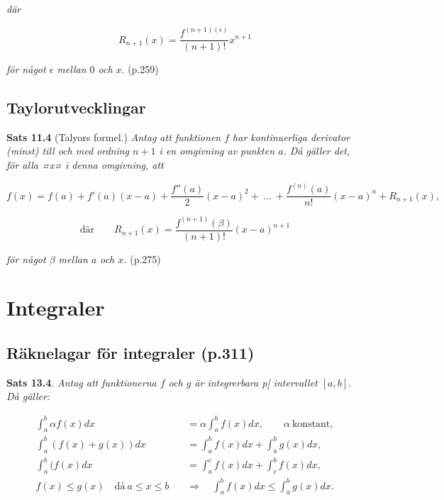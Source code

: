 \documentclass[11pt]{article}
\begin{document}
\textit{där}


\begin{equation}
    R_{n + 1}(x) = \frac{f^{(n + 1)(\epsilon)}}{(n +  1)!}x^{n + 1}
    \label{eq:maclaurinpolynom_rest}
\end{equation}

\textit{för något $\epsilon$ mellan $0$ och $x$}. (p.259)

\subsection{Taylorutvecklingar}

\textbf{Sats 11.4} (Talyors formel.) \textit{Antag att funktionen $f$ har kontinuerliga derivator (minst) till och med ordning $n + 1$ i en omgivning av punkten $a$. Då gäller det, för alla ¤x¤ i denna omgivning, att}

\begin{equation}
    f(x) = f(a) + f'(a)(x - a) + \frac{f''(a)}{2}(x - a)^2 +\ ...\ + \frac{f^{(n)}(a)}{n!}(x - a)^n + R_{n + 1}(x),
\end{equation}

\begin{equation}
    \text{där}\qquad R_{n + 1}(x) = \frac{f^{(n + 1)}(\beta)}{(n + 1)!}(x - a)^{n + 1}
\end{equation}

\textit{för något $\beta$ mellan $a$ och $x$.} (p.275)

\newpage
\section{Integraler}

\subsection{Räknelagar för integraler (p.311)}

\textbf{Sats 13.4}. \textit{Antag att funktionerna $f$ och $g$ är integrerbara p[ intervallet $[a, b]$. Då gäller:}

\begin{align}
    \int_a^b{\alpha f(x)} dx &= \alpha \int_a^b{f(x)} dx, \qquad \alpha\ \text{konstant},\\
    \int_a^b{(f(x) + g(x))} dx &= \int_a^b{f(x)} dx + \int_a^b{g(x)} dx,\\
    \int_a^b{(f(x)} dx &= \int_a^c{f(x)} dx + \int_c^b{f(x)} dx,\\
    f(x) \leq g(x) \quad \text{då}\ a \leq x \leq b \quad &\Rightarrow \quad \int_a^b{f(x)} dx \leq \int_a^b{g(x)} dx.
\end{align}
\end{document}
